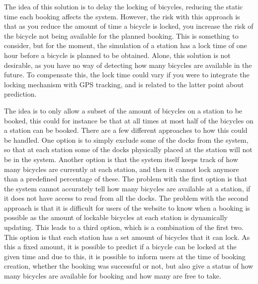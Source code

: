 \begin{description}[style=nextline]
		\item[Lock late]
		The idea of this solution is to delay the locking of bicycles, reducing the static time each booking affects the system.
		However, the risk with this approach is that as you reduce the amount of time a bicycle is locked, you increase the risk of the bicycle not being available for the planned booking.
		This is something to consider, but for the moment, the simulation of a station has a lock time of one hour before a bicycle is planned to be obtained.
		Alone, this solution is not desirable, as you have no way of detecting how many bicycles are available in the future.
		To compensate this, the lock time could vary if you were to integrate the locking mechanism with GPS tracking, and is related to the latter point about prediction.
		
		\item[Subset of bicycles for booking]
		The idea is to only allow a subset of the amount of bicycles on a station to be booked, this could for instance be that at all times at most half of the bicycles on a station can be booked.
		There are a few different approaches to how this could be handled.
		One option is to simply exclude some of the docks from the system, so that at each station some of the docks physically placed at the station will not be in the system.
		Another option is that the system itself keeps track of how many bicycles are currently at each station, and then it cannot lock anymore than a predefined percentage of these.
		The problem with the first option is that the system cannot accurately tell how many bicycles are available at a station, if it does not have access to read from all the docks.
		The problem with the second approach is that it is difficult for users of the website to know when a booking is possible as the amount of lockable bicycles at each station is dynamically updating.
		This leads to a third option, which is a combination of the first two.
		This option is that each station has a set amount of bicycles that it can lock.
		As this a fixed amount, it is possible to predict if a bicycle can be locked at the given time and due to this, it is possible to inform users at the time of booking creation, whether the booking was successful or not, but also give a status of how many bicycles are available for booking and how many are free to take.
		

\end{description}
